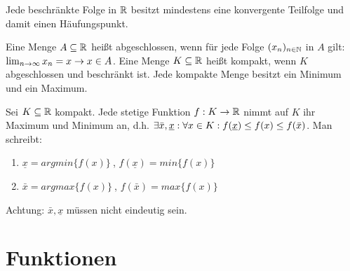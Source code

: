 \documentclass[]{article}
\begin{document}
\begin{satz}
	Jede beschränkte Folge in $\mathbb{R}$ besitzt mindestens eine konvergente Teilfolge und damit einen Häufungspunkt.
\end{satz}

\begin{definition}
	Eine Menge $A \subseteq \mathbb{R}$ heißt abgeschlossen, wenn für jede Folge $(x_n)_{n \in \mathbb{N}}$ in $A$ gilt: $\lim_{n \rightarrow \infty} x_n = x \rightarrow x\in A$. Eine Menge $K \subseteq \mathbb{R}$ heißt kompakt, wenn $K$ abgeschlossen und beschränkt ist. Jede kompakte Menge besitzt ein Minimum und ein Maximum.
\end{definition}

\begin{satz}
	Sei $K \subseteq \mathbb{R}$ kompakt. Jede stetige Funktion $f : K \rightarrow \mathbb{R}$ nimmt auf $K$ ihr Maximum und Minimum an, d.h. $\exists \bar{x}, \underline{x}: \forall x \in K : f(\underline{x}) \leq f(x) \leq f(\bar{x})$. Man schreibt:
	
	\begin{enumerate}[noitemsep]
		\item $\underline{x} = argmin \{ f(x) \} \medspace$, $f(\underline{x}) = min \{f(x)\}$
		\item $\bar{x} = argmax \{ f(x) \} \medspace$, $f(\bar{x}) = max \{f(x)\}$
	\end{enumerate}

	Achtung: $\bar{x}, \underline{x}$ müssen nicht eindeutig sein.
\end{satz}

\pagebreak

 	
\section{Funktionen}

\end{document}

